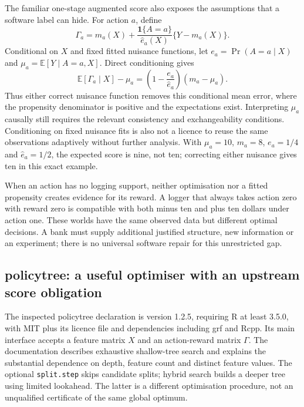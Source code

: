 The familiar one-stage augmented score also exposes the assumptions that a software
label can hide. For action $a$, define
\begin{equation}
 \Gamma_a=m_a(X)+\frac{\mathbf1\{A=a\}}{\widehat e_a(X)}
                      \{Y-m_a(X)\}.
\end{equation}
Conditional on $X$ and fixed fitted nuisance functions, let $e_a=\Pr(A=a\mid X)$
and $\mu_a=\mathbb E[Y\mid A=a,X]$. Direct conditioning gives
\begin{equation}
 \mathbb E[\Gamma_a\mid X]-\mu_a
 =\left(1-\frac{e_a}{\widehat e_a}\right)(m_a-\mu_a).
\end{equation}
Thus either correct nuisance function removes this conditional mean error, where
the propensity denominator is positive and the expectations exist. Interpreting
$\mu_a$ causally still requires the relevant consistency and exchangeability
conditions. Conditioning on fixed nuisance fits is also not a licence to reuse
the same observations adaptively without further analysis. With $\mu_a=10$,
$m_a=8$, $e_a=1/4$ and $\widehat e_a=1/2$, the expected score is nine, not ten;
correcting either nuisance gives ten in this exact example.
\citep{exec24_policiesr_reference}

When an action has no logging support, neither optimisation nor a fitted propensity
creates evidence for its reward. A logger that always takes action zero with reward
zero is compatible with both minus ten and plus ten dollars under action one.
These worlds have the same observed data but different optimal decisions. A bank
must supply additional justified structure, new information or an experiment;
there is no universal software repair for this unrestricted gap.

\subsection{policytree: a useful optimiser with an upstream score obligation}
The inspected policytree declaration is version 1.2.5, requiring R at least 3.5.0,
with MIT plus its licence file and dependencies including grf and Rcpp. Its main
interface accepts a feature matrix $X$ and an action-reward matrix $\Gamma$. The
documentation describes exhaustive shallow-tree search and explains the substantial
dependence on depth, feature count and distinct feature values. The optional
\texttt{split.step} skips candidate splits; hybrid search builds a deeper tree using
limited lookahead. The latter is a different optimisation procedure, not an
unqualified certificate of the same global optimum.
\citep{exec24_policiesr_policytree}

